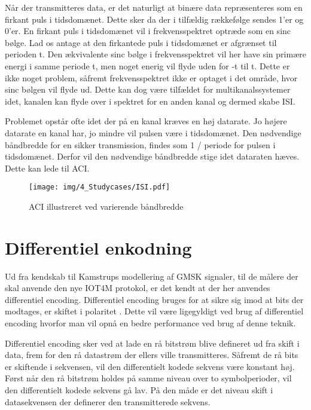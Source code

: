 \begin{appendices}
Når der transmitteres data, er det naturligt at binære data repræsenteres som en firkant puls i tidsdomænet. Dette sker da der i tilfældig rækkefølge sendes 1'er og 0'er. En firkant puls i tidsdomænet vil i frekvensspektret optræde som en sinc bølge. Lad os antage at den firkantede puls i tidsdomænet er afgrænset til perioden t. Den ækvivalente sinc bølge i frekvensspektret vil her have sin primære energi i samme periode t, men noget enerig vil flyde uden for -t til t. Dette er ikke noget problem, såfremt frekvensspektret ikke er optaget i det område, hvor sinc bølgen vil flyde ud. Dette kan dog være tilfældet for multikanalssystemer idet, kanalen kan flyde over i spektret for en anden kanal og dermed skabe ISI. 

Problemet opstår ofte idet der på en kanal kræves en høj datarate. Jo højere datarate en kanal har, jo mindre vil pulsen være i tidsdomænet. Den nødvendige båndbredde for en sikker transmission, findes som 1 / periode for pulsen i tidsdomænet. Derfor vil den nødvendige båndbredde stige idet dataraten hæves. Dette kan lede til ACI. 

\begin{figure}[H]
	\centering{}
	\texttt{[image: img/4\_Studycases/ISI.pdf]}
	\caption{ACI illustreret ved varierende båndbredde}
	\label{fig:ACI}
\end{figure} 

\pagebreak
\section{Differentiel enkodning} \label{appendix::studycase::diffencoding}
Ud fra kendskab til Kamstrups modellering af GMSK signaler, til de målere der skal anvende den nye IOT4M protokol, er det kendt at der her anvendes differentiel encoding. Differentiel encoding bruges for at sikre sig imod at bits der modtages, er skiftet i polaritet \cite{diff-enc}. Dette vil være ligegyldigt ved brug af differentiel encoding hvorfor man vil opnå en bedre performance ved brug af denne teknik. 

Differentiel encoding sker ved at lade en rå bitstrøm blive defineret ud fra skift i data, frem for den rå datastrøm der ellers ville transmitteres. Såfremt de rå bits er skiftende i sekvensen, vil den differentielt kodede sekvens være konstant høj. Først når den rå bitstrøm holdes på samme niveau over to symbolperioder, vil den differentielt kodede sekvens gå lav. På den måde er det niveau skift i datasekvensen der definerer den transmitterede sekvens. 


\end{appendices}
